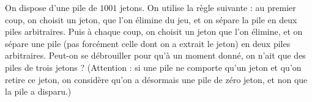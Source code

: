 On dispose d'une pile de $1001$ jetons. On utilise la règle suivante : au premier coup, on choisit un jeton, que l'on élimine du jeu, et on sépare la pile en deux piles arbitraires. Puis à chaque coup, on choisit un jeton que l'on élimine, et on sépare une pile (pas forcément celle dont on a extrait le jeton) en deux piles arbitraires. Peut-on se débrouiller pour qu'à un moment donné, on n'ait que des piles de trois jetons ? (Attention : si une pile ne comporte qu'un jeton et qu'on retire ce jeton, on considère qu'on a désormais une pile de zéro jeton, et non que la pile a disparu.)
